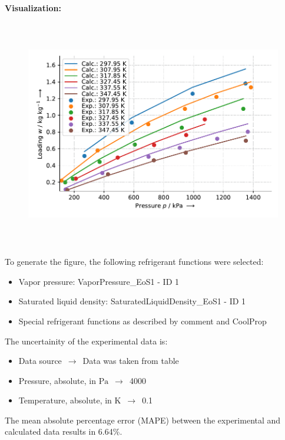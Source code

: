 \textbf{Visualization:}
%
\begin{figure}[!htp]
{\noindent\includegraphics[height=10cm, keepaspectratio]{figs/ads/ads_R-32_activated_carbon_powder_Maxsorb_III_DubininAstakhov_1.pdf}}
\end{figure}
%

To generate the figure, the following refrigerant functions were selected:
\begin{itemize}
\item Vapor pressure: VaporPressure\_EoS1 - ID 1
\item Saturated liquid density: SaturatedLiquidDensity\_EoS1 - ID 1
\item Special refrigerant functions as described by comment and CoolProp
\end{itemize}

The uncertainity of the experimental data is:
\begin{itemize}
\item Data source $\,\to\,$ Data was taken from table
\item Pressure, absolute, in $\si{\pascal}$ $\,\to\,$ 4000
\item Temperature, absolute, in $\si{\kelvin}$ $\,\to\,$ 0.1
\end{itemize}

The mean absolute percentage error (MAPE) between the experimental and calculated data results in 6.64\%.
\FloatBarrier
\newpage
